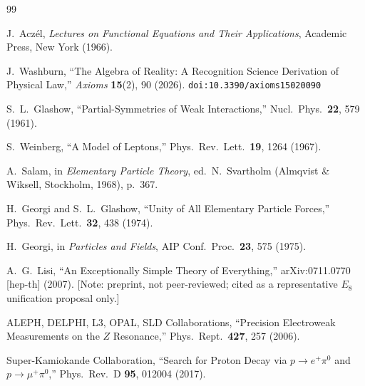 \documentclass[12pt,a4paper]{article}
\theoremstyle{definition}
\theoremstyle{remark}
\begin{document}
\begin{thebibliography}{99}

J.~Acz\'el, \emph{Lectures on Functional Equations and Their Applications},
Academic Press, New York (1966).

J.~Washburn, ``The Algebra of Reality: A Recognition Science Derivation
of Physical Law,'' \emph{Axioms} \textbf{15}(2), 90 (2026).
\texttt{doi:10.3390/axioms15020090}

S.~L.~Glashow, ``Partial-Symmetries of Weak Interactions,''
Nucl.\ Phys.\ \textbf{22}, 579 (1961).

S.~Weinberg, ``A Model of Leptons,'' Phys.\ Rev.\ Lett.\
\textbf{19}, 1264 (1967).

A.~Salam, in \textit{Elementary Particle Theory},
ed.\ N.~Svartholm (Almqvist \& Wiksell, Stockholm, 1968),
p.~367.

H.~Georgi and S.~L.~Glashow, ``Unity of All Elementary
Particle Forces,'' Phys.\ Rev.\ Lett.\ \textbf{32}, 438
(1974).

H.~Georgi, in \textit{Particles and Fields}, AIP Conf.\
Proc.\ \textbf{23}, 575 (1975).

A.~G.~Lisi, ``An Exceptionally Simple Theory of Everything,''
arXiv:0711.0770 [hep-th] (2007). [Note: preprint, not peer-reviewed;
cited as a representative $E_8$ unification proposal only.]

ALEPH, DELPHI, L3, OPAL, SLD Collaborations,
``Precision Electroweak Measurements on the $Z$ Resonance,''
Phys.\ Rept.\ \textbf{427}, 257 (2006).

Super-Kamiokande Collaboration, ``Search for Proton Decay
via $p \to e^+ \pi^0$ and $p \to \mu^+ \pi^0$,''
Phys.\ Rev.\ D \textbf{95}, 012004 (2017).

\end{thebibliography}
\end{document}
